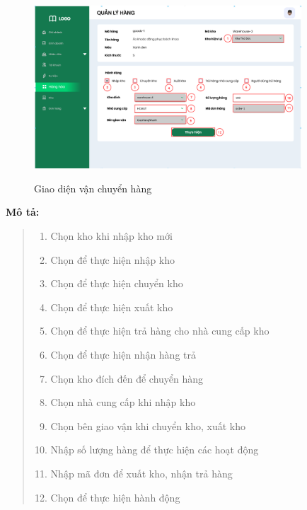             \begin{figure}[!htp]
                \centering
                \includegraphics[width=10cm]{img/UI/admin/Goods_tranfer.png}
                \label{39}
                \newline
                \caption{Giao diện vận chuyển hàng}
            \end{figure}
            \textbf{Mô tả:}  
            \begin{quote}
                \begin{enumerate}
                    \item Chọn kho khi nhập kho mới
                    \item Chọn để thực hiện nhập kho
                    \item Chọn để thực hiện chuyển kho
                    \item Chọn để thực hiện xuất kho
                    \item Chọn để thực hiện trả hàng cho nhà cung cấp kho
                    \item Chọn để thực hiện nhận hàng trả
                    \item Chọn kho đích đến để chuyển hàng
                    \item Chọn nhà cung cấp khi nhập kho
                    \item Chọn bên giao vận khi chuyển kho, xuất kho
                    \item Nhập số lượng hàng để thực hiện các hoạt động
                    \item Nhập mã đơn để xuất kho, nhận trả hàng
                    \item Chọn để thực hiện hành động
                \end{enumerate}
            \end{quote}
        
        
        
